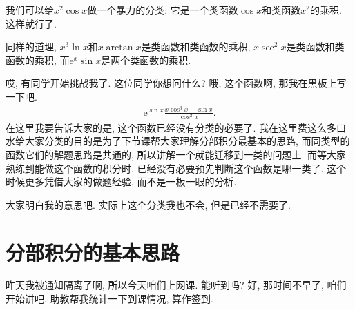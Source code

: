 \documentclass{ctexbook}
\newcommand{\e}{\mathrm{e}}
\begin{document}
{我们可以给$x^{2}\cos{x}$做一个暴力的分类: 它是一个\uppercase\expandafter{}类函数$\cos{x}$和\uppercase\expandafter{}类函数$x^{2}$的乘积. 这样就行了. \par
同样的道理, $x^{3}\ln{x}$和$x\arctan{x}$是\uppercase\expandafter{}类函数和\uppercase\expandafter{}类函数的乘积, $x\sec^{2}{x}$是\uppercase\expandafter{}类函数和\uppercase\expandafter{}类函数的乘积, 而$\e^{x}\sin{x}$是两个\uppercase\expandafter{}类函数的乘积. \par
哎, 有同学开始挑战我了. 这位同学你想问什么? 哦, 这个函数啊, 那我在黑板上写一下吧. 
\begin{align*}
\e^{\sin{x}}\frac{x\cos^{3}{x}-\sin{x}}{\cos^{2}{x}}
.\end{align*}
在这里我要告诉大家的是, 这个函数已经没有分类的必要了. 我在这里费这么多口水给大家分类的目的是为了下节课帮大家理解分部积分最基本的思路, 而同类型的函数它们的解题思路是共通的, 所以讲解一个就能迁移到一类的问题上. 而等大家熟练到能做这个函数的积分时, 已经没有必要预先判断这个函数是哪一类了. 这个时候更多凭借大家的做题经验, 而不是一板一眼的分析. \par
大家明白我的意思吧. 实际上这个分类我也不会, 但是已经不需要了. \par
\section{分部积分的基本思路}
昨天我被通知隔离了啊, 所以今天咱们上网课. 能听到吗? 好, 那时间不早了, 咱们开始讲吧. 助教帮我统计一下到课情况, 算作签到. \par
}
\end{document}
